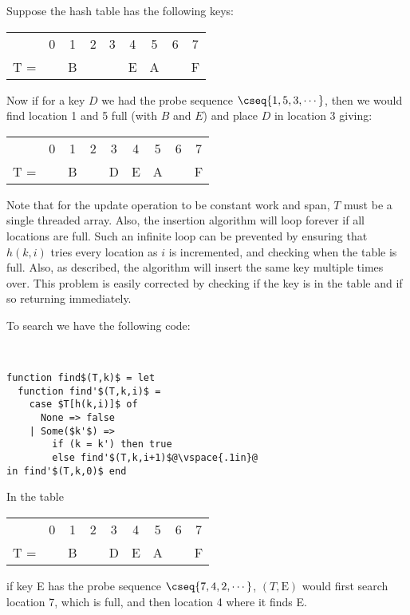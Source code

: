 \begin{example}
Suppose the hash table has the following keys:
\begin{center}
\begin{tabular}{l c c c c c c c c }
         & 0 & 1 & 2 & 3 & 4 & 5 & 6 & 7 \\ \cline{2-9}
  T = &    &  B &    &    & E & A &    & F \\\cline{2-9}
\end{tabular}
\end{center}
Now if for a key $D$ we had the probe sequence $\cseq{1, 5, 3,
  \cdots}$, then we would find location 1 and 5 full (with $B$ and
$E$) and place $D$ in location 3 giving:
\begin{center}
\begin{tabular}{l c c c c c c c c }
      & 0 & 1 & 2 & 3 & 4 & 5 & 6 & 7 \\ \cline{2-9}
  T = &   & B &   & D & E & A &   & F \\ \cline{2-9}
\end{tabular}
\end{center}
\end{example}

Note that for the update operation to be constant work and span, $T$
must be a single threaded array.  Also, the insertion algorithm will
loop forever if all locations are full.  Such an infinite loop can be
prevented by ensuring that $h(k,i)$ tries every location as $i$ is
incremented, and checking when the table is full.  Also, as described,
the algorithm will insert the same key multiple times over.  This
problem is easily corrected by checking if the key is in the table and
if so returning immediately.

To search we have the following code:

\begin{algorithm}~
\begin{lstlisting}
function find$(T,k)$ = let
  function find'$(T,k,i)$ =
    case $T[h(k,i)]$ of
      None => false
    | Some($k'$) =>
        if (k = k') then true
        else find'$(T,k,i+1)$@\vspace{.1in}@
in find'$(T,k,0)$ end
\end{lstlisting}
\end{algorithm}

\begin{example}
In the table 
\begin{center}
\begin{tabular}{l c c c c c c c c }
      & 0 & 1 & 2 & 3 & 4 & 5 & 6 & 7 \\ \cline{2-9}
  T = &   & B &   & D & E & A &   & F \\ \cline{2-9}
\end{tabular}
\end{center}
if key E has the probe sequence $\cseq{7, 4, 2, \cdots}$,
$(T,\mbox{E})$ would first search location 7, which is full,
and then location 4 where it finds E.
\end{example}

